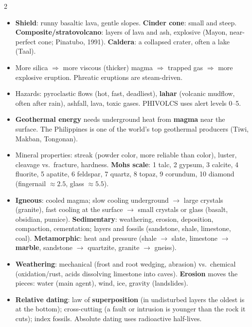 \documentclass[10pt]{article}
\makeatletter
\newcommand{\sub}[1]{\par\vspace{2.5pt}{\sffamily\bfseries\color{dblue}#1}\par\nobreak\vspace{0.5pt}\@afterheading}
\newcommand{\term}[1]{\textbf{\color{dnavy}#1}}
\makeatother
\begin{document}
\begin{multicols}{2}
\sub{D. Volcanoes}
\begin{itemize}
\item \term{Shield}: runny basaltic lava, gentle slopes. \term{Cinder cone}: small and steep. \term{Composite/stratovolcano}: layers of lava and ash, explosive (Mayon, near-perfect cone; Pinatubo, 1991). \term{Caldera}: a collapsed crater, often a lake (Taal).
\item More silica $\Rightarrow$ more viscous (thicker) magma $\Rightarrow$ trapped gas $\Rightarrow$ more explosive eruption. Phreatic eruptions are steam-driven.
\item Hazards: pyroclastic flows (hot, fast, deadliest), \textbf{lahar} (volcanic mudflow, often after rain), ashfall, lava, toxic gases. PHIVOLCS uses alert levels 0--5.
\item \term{Geothermal energy} needs underground heat from \textbf{magma} near the surface. The Philippines is one of the world's top geothermal producers (Tiwi, Makban, Tongonan).
\end{itemize}

\sub{E. Minerals and rocks}
\begin{itemize}
\item Mineral properties: streak (powder color, more reliable than color), luster, cleavage vs.\ fracture, hardness. \term{Mohs scale}: 1 talc, 2 gypsum, 3 calcite, 4 fluorite, 5 apatite, 6 feldspar, 7 quartz, 8 topaz, 9 corundum, 10 diamond (fingernail $\approx2.5$, glass $\approx5.5$).
\item \term{Igneous}: cooled magma; slow cooling underground $\to$ large crystals (granite), fast cooling at the surface $\to$ small crystals or glass (basalt, obsidian, pumice). \term{Sedimentary}: weathering, erosion, deposition, compaction, cementation; layers and fossils (sandstone, shale, limestone, coal). \term{Metamorphic}: heat and pressure (shale $\to$ slate, limestone $\to$ \textbf{marble}, sandstone $\to$ quartzite, granite $\to$ gneiss).
\item \term{Weathering}: mechanical (frost and root wedging, abrasion) vs.\ chemical (oxidation/rust, acids dissolving limestone into caves). \term{Erosion} moves the pieces: water (main agent), wind, ice, gravity (landslides).
\item \term{Relative dating}: law of \textbf{superposition} (in undisturbed layers the oldest is at the bottom); cross-cutting (a fault or intrusion is younger than the rock it cuts); index fossils. Absolute dating uses radioactive half-lives.
\end{itemize}


\end{multicols}
\end{document}
